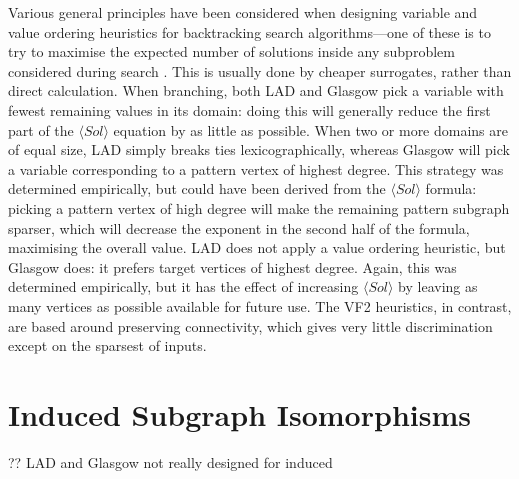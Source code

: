 \documentclass[twoside,11pt]{article}
\newcommand{\citep}[1]{\cite{#1}}
\begin{document}
Various general principles have been considered when designing variable and value ordering
heuristics for backtracking search algorithms---one of these is to try to maximise the expected
number of solutions inside any subproblem considered during search \citep{DBLP:conf/cp/GentMPSW96}.  This is
usually done by cheaper surrogates, rather than direct calculation. When branching, both LAD and
Glasgow pick a variable with fewest remaining values in its domain: doing this will generally reduce
the first part of the $\langle Sol \rangle$ equation by as little as possible. When two or more
domains are of equal size, LAD simply breaks ties lexicographically, whereas Glasgow will pick a
variable corresponding to a pattern vertex of highest degree. This strategy was determined
empirically, but could have been derived from the $\langle Sol \rangle$ formula: picking a pattern
vertex of high degree will make the remaining pattern subgraph sparser, which will decrease the
exponent in the second half of the formula, maximising the overall value. LAD does not apply a value
ordering heuristic, but Glasgow does: it prefers target vertices of highest degree.  Again, this was
determined empirically, but it has the effect of increasing $\langle Sol \rangle$ by leaving as many
vertices as possible available for future use. The VF2 heuristics, in contrast, are based around
preserving connectivity, which gives very little discrimination except on the sparsest of inputs.

\section{Induced Subgraph Isomorphisms}

?? LAD and Glasgow not really designed for induced
\end{document}
